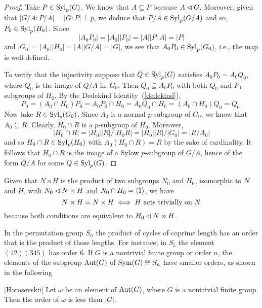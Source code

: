 \begin{proof} Take $P\in{\rm Syl}_p(G)$. We know that $A\subseteq P$ because $A\lhd G$. Moreover, given that $|G/A:P/A|=|G:P|\perp p$, we deduce that $P/A\in{\rm Syl}_p(G/A)$ and so, $P_0\in{\rm Syl}_p(H_0)$. Since
$$
    |A_0P_0|=|A_0||P_0|=|A||P:A|=|P|
$$
and $|G_0|=|A_0||H_0|=|A||G/A|=|G|$, we see that $A_0P_0\in{\rm Syl}_p(G_0)$, i.e., the map is well-defined.

To verify that the injectivity suppose that $Q\in{\rm Syl}_p(G)$ satisfies $A_0P_0=A_0Q_0$, where $Q_0$ is the image of $Q/A$ in~$G_0$. Then $Q_0\subseteq A_0P_0$ with both $Q_0$ and $P_0$ subgroups of $H_0$. By the Dedekind Identity~(\ref{dedekind}),
$$
    P_0=(A_0\cap H_0)P_0=A_0P_0\cap H_0=A_0Q_0\cap H_0=(A_0\cap H_0)Q_0=Q_0.
$$
Now take $R\in{\rm Syl}_p(G_0)$. Since $A_0$ is a normal $p$-subgroup of $G_0$, we know that $A_0\subseteq R$. Clearly, $H_0\cap R$ is a $p$-subgroup of $H_0$. Moreover,
$$
    |H_0\cap R|=|H_0||R|/|H_0R| = |H_0||R|/|G_0| = |R/A_0|
$$
and so $H_0\cap R\in{\rm Syl}_p(H_0)$ with $A_0(H_0\cap R)=R$ by the sake of cardinality. It follows that $H_0\cap R$ is the image of a Sylow $p$-subgroup of $G/A$, hence of the form $Q/A$ for some $Q\in{\rm Syl}_p(G)$.  \end{proof}

\begin{rem}\label{semidirect-is-direct}
    Given that\/ $N\rtimes H$ is the product of two subgroups\/ $N_0$ and\/ $H_0$, isomorphic to\/ $N$ and\/ $H$, with\/ $N_0\lhd N\rtimes H$ and\/ $N_0\cap H_0=\langle1\rangle$, we have
    $$
        N\rtimes H=N\times H \iff H \text{\rm\ acts trivially on }N
    $$
    because both conditions are equivalent to $H_0\lhd N\rtimes H$.
\end{rem}

\begin{rem}
    In the permutation group $S_n$ the product of cycles of coprime length has an order that is the product of those lengths. For instance, in $S_5$ the element $(12)(345)$ has order $6$. If $G$ is a nontrivial finite group or order $n$, the elements of the subgroup ${\rm Aut}(G)$ of ${\rm Sym}(G)\cong S_n$ have smaller orders, as shown in the following
\end{rem}

\begin{cor}\label{horosevskii}
    {\rm[Horosevskii]} Let\/ $\omega$ be an element of\/ ${\rm Aut}(G)$, where\/ $G$ is a nontrivial finite group. Then the order of\/ $\omega$ is less than\/ $|G|$.
\end{cor}

